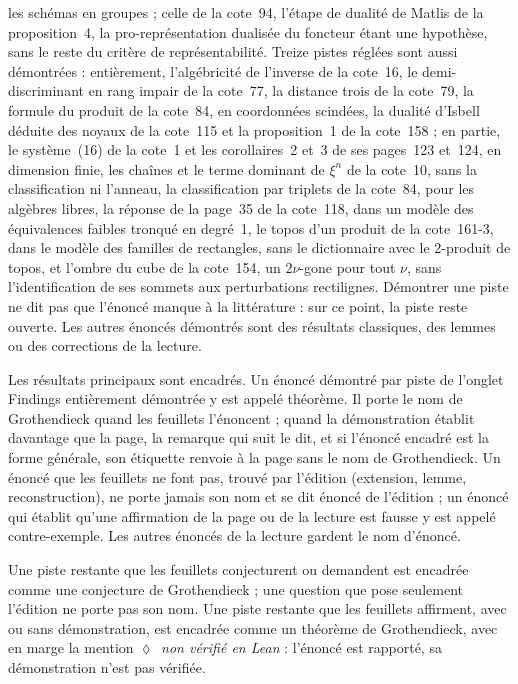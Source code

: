 \documentclass[11pt]{article}
\theoremstyle{plain}
\theoremstyle{definition}
\theoremstyle{plain}
\theoremstyle{definition}
\theoremstyle{remark}
\renewcommand{\_}{\bkunderscore\allowbreak}
\begin{document}
les schémas en groupes ; celle de la cote~94, l'étape de dualité de Matlis de la proposition~4, la pro-représentation dualisée du foncteur étant une hypothèse, sans le reste du critère de représentabilité. Treize pistes réglées sont aussi démontrées : entièrement, l'algébricité de l'inverse de la cote~16, le demi-discriminant en rang impair de la cote~77, la distance trois de la cote~79, la formule du produit de la cote~84, en coordonnées scindées, la dualité d'Isbell déduite des noyaux de la cote~115 et la proposition~1 de la cote~158 ; en partie, le système~(16) de la cote~1 et les corollaires~2 et~3 de ses pages~123 et~124, en dimension finie, les chaînes et le terme dominant de $\xi^n$ de la cote~10, sans la classification ni l'anneau, la classification par triplets de la cote~84, pour les algèbres libres, la réponse de la page~35 de la cote~118, dans un modèle des équivalences faibles tronqué en degré~1, le topos d'un produit de la cote~161-3, dans le modèle des familles de rectangles, sans le dictionnaire avec le $2$-produit de topos, et l'ombre du cube de la cote~154, un $2\nu$-gone pour tout $\nu$, sans l'identification de ses sommets aux perturbations rectilignes. Démontrer une piste ne dit pas que l'énoncé manque à la littérature : sur ce point, la piste reste ouverte. Les autres énoncés démontrés sont des résultats classiques, des lemmes ou des corrections de la lecture.

Les résultats principaux sont encadrés. Un énoncé démontré par piste de l'onglet Findings entièrement démontrée y est appelé théorème. Il porte le nom de Grothendieck quand les feuillets l'énoncent ; quand la démonstration établit davantage que la page, la remarque qui suit le dit, et si l'énoncé encadré est la forme générale, son étiquette renvoie à la page sans le nom de Grothendieck. Un énoncé que les feuillets ne font pas, trouvé par l'édition (extension, lemme, reconstruction), ne porte jamais son nom et se dit énoncé de l'édition ; un énoncé qui établit qu'une affirmation de la page ou de la lecture est fausse y est appelé contre-exemple. Les autres énoncés de la lecture gardent le nom d'énoncé.

Une piste restante que les feuillets conjecturent ou demandent est encadrée comme une conjecture de Grothendieck ; une question que pose seulement l'édition ne porte pas son nom. Une piste restante que les feuillets affirment, avec ou sans démonstration, est encadrée comme un théorème de Grothendieck, avec en marge la mention \textcolor{piste}{\ensuremath{\lozenge}}~\emph{non vérifié en Lean} : l'énoncé est rapporté, sa démonstration n'est pas vérifiée.
\end{document}
